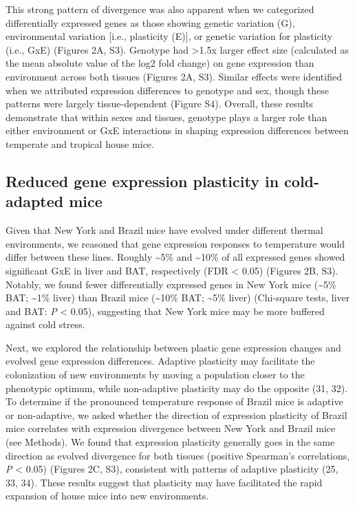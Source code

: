 \documentclass[9pt,twocolumn,twoside,lineno]{pnas-new}
\begin{document}
This strong pattern of divergence was also apparent when we categorized
differentially expressed genes as those showing genetic variation (G),
environmental variation {[}i.e., plasticity (E){]}, or genetic variation
for plasticity (i.e., GxE) (Figures 2A, S3). Genotype had
\textgreater1.5x larger effect size (calculated as the mean absolute
value of the log2 fold change) on gene expression than environment
across both tissues (Figures 2A, S3). Similar effects were identified
when we attributed expression differences to genotype and sex, though
these patterns were largely tissue-dependent (Figure S4). Overall, these
results demonstrate that within sexes and tissues, genotype plays a
larger role than either environment or GxE interactions in shaping
expression differences between temperate and tropical house mice.

\hypertarget{reduced-gene-expression-plasticity-in-cold-adapted-mice}{%
\subsection*{Reduced gene expression plasticity in cold-adapted
mice}\label{reduced-gene-expression-plasticity-in-cold-adapted-mice}}

Given that New York and Brazil mice have evolved under different thermal
environments, we reasoned that gene expression responses to temperature
would differ between these lines. Roughly \textasciitilde5\% and
\textasciitilde10\% of all expressed genes showed significant GxE in
liver and BAT, respectively (FDR \textless{} 0.05) (Figures 2B, S3).
Notably, we found fewer differentially expressed genes in New York mice
(\textasciitilde5\% BAT; \textasciitilde1\% liver) than Brazil mice
(\textasciitilde10\% BAT; \textasciitilde5\% liver) (Chi-square tests,
liver and BAT: \emph{P} \textless{} 0.05), suggesting that New York mice
may be more buffered against cold stress.

Next, we explored the relationship between plastic gene expression
changes and evolved gene expression differences. Adaptive plasticity may
facilitate the colonization of new environments by moving a population
closer to the phenotypic optimum, while non-adaptive plasticity may do
the opposite (31, 32). To determine if the pronounced temperature
response of Brazil mice is adaptive or non-adaptive, we asked whether
the direction of expression plasticity of Brazil mice correlates with
expression divergence between New York and Brazil mice (see Methods). We
found that expression plasticity generally goes in the same direction as
evolved divergence for both tissues (positive Spearman's correlations,
\emph{P} \textless{} 0.05) (Figures 2C, S3), consistent with patterns of
adaptive plasticity (25, 33, 34). These results suggest that plasticity
may have facilitated the rapid expansion of house mice into new
environments.
\end{document}
